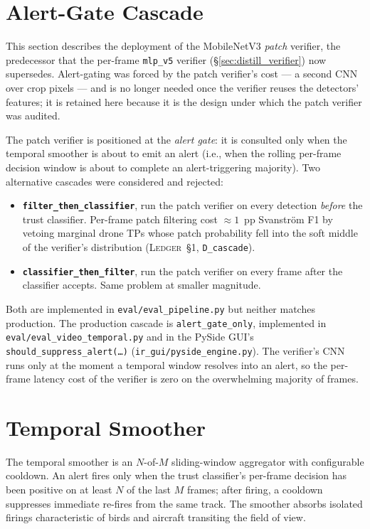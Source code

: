 \documentclass[12pt,a4paper,oneside,openright]{book}
\begin{document}
\section{Alert-Gate Cascade}
\label{sec:alert_gate}

This section describes the deployment of the MobileNetV3 \emph{patch} verifier, the predecessor that the per-frame \texttt{mlp\_v5} verifier (\S\ref{sec:distill_verifier}) now supersedes. Alert-gating was forced by the patch verifier's cost --- a second CNN over crop pixels --- and is no longer needed once the verifier reuses the detectors' features; it is retained here because it is the design under which the patch verifier was audited.

The patch verifier is positioned at the \emph{alert gate}: it is consulted only when the temporal smoother is about to emit an alert (i.e., when the rolling per-frame decision window is about to complete an alert-triggering majority). Two alternative cascades were considered and rejected:

\begin{itemize}
    \item \textbf{\texttt{filter\_then\_classifier}}, run the patch verifier on every detection \emph{before} the trust classifier. Per-frame patch filtering cost $\approx 1$~pp Svanstr\"om F1 by vetoing marginal drone TPs whose patch probability fell into the soft middle of the verifier's distribution (\textsc{Ledger}~\S1, \texttt{D\_cascade}).
    \item \textbf{\texttt{classifier\_then\_filter}}, run the patch verifier on every frame after the classifier accepts. Same problem at smaller magnitude.
\end{itemize}

Both are implemented in \texttt{eval/eval\_pipeline.py} but neither matches production. The production cascade is \texttt{alert\_gate\_only}, implemented in \texttt{eval/eval\_video\_temporal.py} and in the PySide GUI's \texttt{should\_suppress\_alert(\dots)} (\texttt{ir\_gui/pyside\_engine.py}). The verifier's CNN runs only at the moment a temporal window resolves into an alert, so the per-frame latency cost of the verifier is zero on the overwhelming majority of frames.

\section{Temporal Smoother}
\label{sec:temporal}

The temporal smoother is an $N$-of-$M$ sliding-window aggregator with configurable cooldown. An alert fires only when the trust classifier's per-frame decision has been positive on at least $N$ of the last $M$ frames; after firing, a cooldown suppresses immediate re-fires from the same track. The smoother absorbs isolated firings characteristic of birds and aircraft transiting the field of view.
\end{document}

